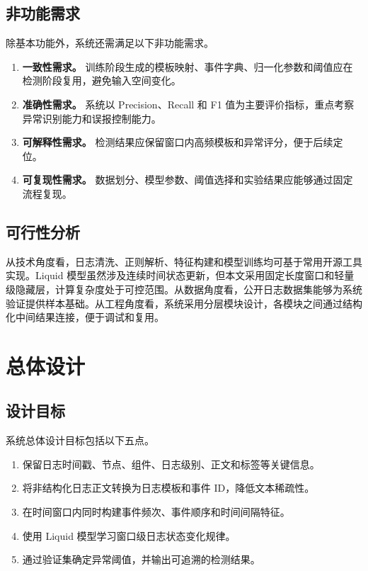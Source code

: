 \subsection{非功能需求}

除基本功能外，系统还需满足以下非功能需求。

\begin{enumerate}
    \item \textbf{一致性需求。} 训练阶段生成的模板映射、事件字典、归一化参数和阈值应在检测阶段复用，避免输入空间变化。
    \item \textbf{准确性需求。} 系统以 Precision、Recall 和 F1 值为主要评价指标，重点考察异常识别能力和误报控制能力。
    \item \textbf{可解释性需求。} 检测结果应保留窗口内高频模板和异常评分，便于后续定位。
    \item \textbf{可复现性需求。} 数据划分、模型参数、阈值选择和实验结果应能够通过固定流程复现。
\end{enumerate}

\subsection{可行性分析}

从技术角度看，日志清洗、正则解析、特征构建和模型训练均可基于常用开源工具实现。Liquid 模型虽然涉及连续时间状态更新，但本文采用固定长度窗口和轻量级隐藏层，计算复杂度处于可控范围。从数据角度看，公开日志数据集能够为系统验证提供样本基础。从工程角度看，系统采用分层模块设计，各模块之间通过结构化中间结果连接，便于调试和复用。

\section{总体设计}

\subsection{设计目标}

系统总体设计目标包括以下五点。

\begin{enumerate}
    \item 保留日志时间戳、节点、组件、日志级别、正文和标签等关键信息。
    \item 将非结构化日志正文转换为日志模板和事件 ID，降低文本稀疏性。
    \item 在时间窗口内同时构建事件频次、事件顺序和时间间隔特征。
    \item 使用 Liquid 模型学习窗口级日志状态变化规律。
    \item 通过验证集确定异常阈值，并输出可追溯的检测结果。
\end{enumerate}

